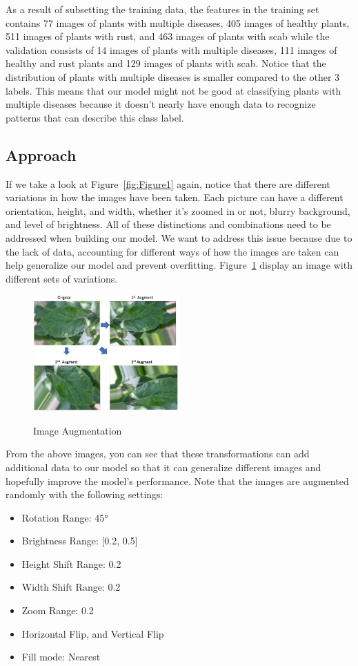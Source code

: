 \documentclass[man,floatsintext]{apa7}
\begin{document}
\begin{singlespace}
As a result of subsetting the training data, the features in the training set contains 77
images of plants with multiple diseases, 405 images of healthy plants, 511 images of plants with rust, and 463 images of plants with scab while the validation consists of 14 images of plants with multiple diseases, 111 images of healthy and rust plants and 129 images of plants with scab.
Notice that the distribution of plants with multiple diseases is smaller compared to the other 3
labels. This means that our model might not be good at classifying plants with multiple diseases
because it doesn’t nearly have enough data to recognize patterns that can describe this class label.


\subsection{Approach}
If we take a look at Figure~\ref{fig:Figure1} again, notice that there are different variations in how the
images have been taken. Each picture can have a different orientation, height, and width,
whether it’s zoomed in or not, blurry background, and level of brightness. All of these distinctions and combinations need to be addressed when building our model. We want to address this issue because due to the lack of data, accounting for different ways of how the images are taken can help generalize our model and prevent overfitting. Figure~\ref{fig:Figure3} display an image with different sets of variations. 

\begin{figure}
  \centering
  \caption{Image Augmentation}
  \includegraphics[width=0.5\textwidth]{images/image3.jpg}
  \label{fig:Figure3}
\end{figure}

From the above images, you can see that these transformations can add additional data
to our model so that it can generalize different images and hopefully improve the model’s
performance. Note that the images are augmented randomly with the following settings:
\begin{itemize}[itemsep=1mm, parsep=0pt]
  \item Rotation Range: 45°
  \item Brightness Range: [0.2, 0.5]
  \item Height Shift Range: 0.2
  \item Width Shift Range: 0.2
  \item Zoom Range: 0.2
  \item Horizontal Flip, and Vertical Flip
  \item Fill mode: Nearest
\end{itemize}


\end{singlespace}
\end{document}
